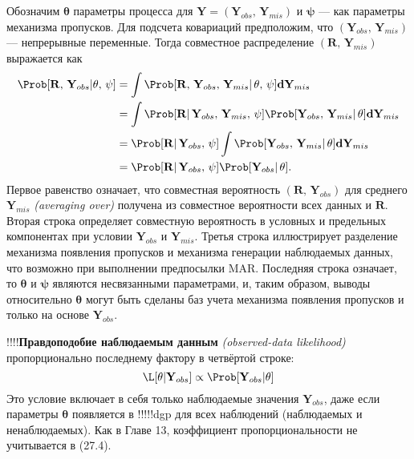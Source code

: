Обозначим $\mathbf{\theta}$ параметры процесса для $\mathbf{Y}=(\mathbf{Y}_{obs}, \, \mathbf{Y}_{mis})$ и $\mathbf{\psi}$ --- как параметры механизма пропусков. Для подсчета ковариаций предположим, что $(\mathbf{Y}_{obs}, \, \mathbf{Y}_{mis})$ --– непрерывные переменные. Тогда совместное распределение $(\mathbf{R}, \, \mathbf{Y}_{mis})$ выражается как 
\begin{align}
\Prob[\mathbf{R}, \, \mathbf{Y}_{obs} | \mathbf{\theta}, \, \mathbf{\psi}] &= \int \Prob[\mathbf{R}, \, \mathbf{Y}_{obs}, \, \mathbf{Y}_{mis}| \, \mathbf{\theta}, \, \mathbf{\psi}]\mathbf{dY}_{mis} \\
&= \int \Prob[\mathbf{R}| \, \mathbf{Y}_{obs}, \, \mathbf{Y}_{mis}, \, \mathbf{\psi}] \Prob[\mathbf{Y}_{obs}, \, \mathbf{Y}_{mis}| \, \mathbf{\theta}]\mathbf{dY}_{mis} \notag \\
&= \Prob[\mathbf{R}| \, \mathbf{Y}_{obs}, \, \mathbf{\psi}] \int \Prob [\mathbf{Y}_{obs}, \, \mathbf{Y}_{mis}| \, \mathbf{\theta}]\mathbf{dY}_{mis} \notag \\
&=\Prob[\mathbf{R}| \, \mathbf{Y}_{obs}, \, \mathbf{\psi}] \Prob[\mathbf{Y}_{obs}| \, \mathbf{\theta}]. \notag
\end{align}
Первое равенство означает, что совместная вероятность $(\mathbf{R}, \, \mathbf{Y}_{obs})$ для среднего $\mathbf{Y}_{mis}$ \emph{(averaging over)} получена из совместное вероятности всех данных и $\mathbf{R}$. Вторая строка определяет совместную вероятность в условных и предельных компонентах при условии $\mathbf{Y}_{obs}$ и $\mathbf{Y}_{mis}$. Третья строка иллюстрирует разделение механизма  появления пропусков и механизма генерации наблюдаемых данных, что возможно при выполнении предпосылки MAR. Последняя строка означает, то $\mathbf{\theta}$ и $\mathbf{\psi}$ являются несвязанными параметрами, и, таким образом, выводы относительно $\mathbf{\theta}$ могут быть сделаны баз учета механизма появления пропусков и только на основе $\mathbf{Y}_{obs}$. 

!!!!{\bf Правдоподобие наблюдаемым данным} \emph{(observed-data likelihood)} пропорционально последнему фактору в четвёртой строке:
\begin{equation}
\L[\mathbf{\theta}|\mathbf{Y}_{obs}] \propto \Prob[\mathbf{Y}_{obs}|\mathbf{\theta}]
\end{equation}
Это условие включает в себя только наблюдаемые значения $\mathbf{Y}_{obs}$, даже если параметры $\mathbf{\theta}$ появляется в !!!!!dgp для всех наблюдений (наблюдаемых и ненаблюдаемых). Как в Главе 13, коэффициент пропорциональности не учитывается в (27.4).

